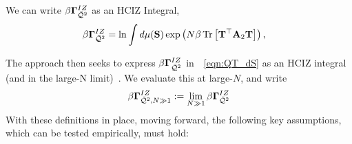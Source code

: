 We can write $\beta\mathbf{\Gamma}^{IZ}_{\bar{\mathcal{Q}}^{2}}$ as an HCIZ Integral, 
\begin{align}
  \label{eqn:QT_dS}
  \beta\mathbf{\Gamma}^{IZ}_{\bar{\mathcal{Q}}^{2}}  &=  \ln\int d\mu(\mathbf{S})\exp\left(N\beta\mbox{}\operatorname{Tr}\left[\mathbf{T}^{\top}\mathbf{A}_2\mathbf{T}\right]\right),
\end{align}



The \SETOL approach then seeks to express $\beta\mathbf{\Gamma}^{IZ}_{\bar{\mathcal{Q}}^{2}}$ in~\EQN~\ref{eqn:QT_dS} as an HCIZ integral (and in the large-N limit)~\cite{potters_bouchaud_2020,Tanaka2007,Tanaka2008}.
We evaluate this at large-$N$, and write
\begin{equation}
  \beta\mathbf{\Gamma}^{IZ}_{\bar{\mathcal{Q}}^{2},N\gg 1}:=\lim_{N\gg 1}\beta\mathbf{\Gamma}^{IZ}_{\bar{\mathcal{Q}}^{2}}
\end{equation}
With these definitions in place, moving forward, the following key assumptions, which can be tested empirically, must hold:
